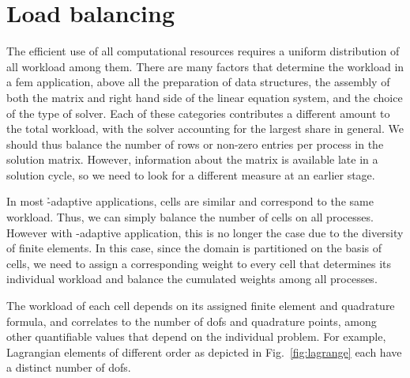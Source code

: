 \section{Load balancing}
\label{sec:balancing}

The efficient use of all computational resources requires a uniform distribution of all workload among them. There are many factors that determine the workload in a \gls{fem} application, above all the preparation of data structures, the assembly of both the matrix and right hand side of the linear equation system, and the choice of the type of solver. Each of these categories contributes a different amount to the total workload, with the solver accounting for the largest share in general. We should thus balance the number of rows or non-zero entries per process in the solution matrix. However, information about the matrix is available late in a solution cycle, so we need to look for a different measure at an earlier stage.

In most \h-adaptive applications, cells are similar and correspond to the same workload. Thus, we can simply balance the number of cells on all processes. However with \hp-adaptive application, this is no longer the case due to the diversity of finite elements. %
In this case, since the domain is partitioned on the basis of cells, we need to assign a corresponding weight to every cell that determines its individual workload and balance the cumulated weights among all processes.

The workload of each cell depends on its assigned finite element and quadrature formula, and correlates to the number of \glspl{dof} and quadrature points, among other quantifiable values that depend on the individual problem. For example, Lagrangian elements of different order as depicted in Fig.~\ref{fig:lagrange} each have a distinct number of \glspl{dof}.




